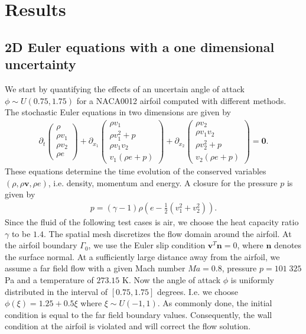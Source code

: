 \section{Results}
\label{sec:results}

\subsection{2D Euler equations with a one dimensional uncertainty}
\label{sec:resultsNACA1D}
We start by quantifying the effects of an uncertain angle of attack $\phi\sim U(0.75,1.75)$ for a NACA0012 airfoil computed with different methods. The stochastic Euler equations in two dimensions are given by
\begin{align*}
\partial_t
\begin{pmatrix}
\rho \\ \rho v_1 \\ \rho v_2 \\ \rho e
\end{pmatrix}
+\partial_{x_1}
\begin{pmatrix}
\rho v_1 \\ \rho v_1^2 +p \\ \rho v_1 v_2 \\  v_1 (\rho e+p)
\end{pmatrix}
+\partial_{x_2}
\begin{pmatrix}
\rho v_2 \\ \rho v_1 v_2 \\ \rho v_2^2+p \\ v_2 (\rho e+p)
\end{pmatrix}
=\bm{0}.
\end{align*}
These equations determine the time evolution of the conserved variables $(\rho,\rho \bm v, \rho e)$, i.e. density, momentum and energy. A closure for the pressure $p$ is given by
\begin{align*}
p = (\gamma-1)\rho\left(e-\frac12(v_1^2+v_2^2)\right).
\end{align*}
Since the fluid of the following test cases is air, we choose the heat capacity ratio $\gamma$ to be $1.4$. The spatial mesh discretizes the flow domain around the airfoil. At the airfoil boundary $\Gamma_{0}$, we use the Euler slip condition $\bm v^T\bm n = 0$, where $\bm n$ denotes the surface normal. At a sufficiently large distance away from the airfoil, we assume a far field flow with a given Mach number $Ma = 0.8$, pressure $p = 101\;325$ Pa and a temperature of $273.15$ K. Now the angle of attack $\phi$ is uniformly distributed in the interval of $[0.75,1.75]$ degrees. I.e. we choose $\phi(\xi) = 1.25 + 0.5\xi$ where $\xi\sim U(-1,1)$. As commonly done, the initial condition is equal to the far field boundary values. Consequently, the wall condition at the airfoil is violated and will correct the flow solution. 

